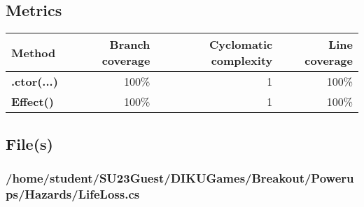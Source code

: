\documentclass[a4paper,landscape,10pt]{article}
\begin{document}
\subsection{Metrics}
\begin{longtable}[l]{|l|r|r|r|}
\hline
\textbf{Method} & \textbf{Branch coverage} & \textbf{Cyclomatic complexity} & \textbf{Line coverage}\\
\hline
\textbf{.ctor(...)} & 100\% & 1 & 100\%\\
\hline
\textbf{Effect()} & 100\% & 1 & 100\%\\
\hline
\end{longtable}
\subsection{File(s)}
\subsubsection{/home/student/SU23Guest/DIKUGames/Breakout/Powerups/Hazards/LifeLoss.cs}
\end{document}
